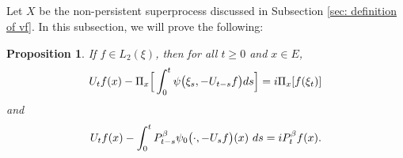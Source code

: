 \documentclass[12pt]{amsart}
\theoremstyle{plain}
\newtheorem{prop}[thm]{Proposition}
\theoremstyle{definition}
\numberwithin{equation}{section}
\begin{document}
\subsection{}
	Let $X$ be the non-persistent superprocess discussed in Subsection \ref{sec: definition of vf}. 
	In this subsection, we will prove the following:
	\begin{prop}
\label{prop: complex FKPP-equation}
    If $f\in L_2(\xi)$,  then for all $t\geq 0$ and $x\in E$,
\begin{equation}
\label{eq: complex FKPP-equation}
    U_tf(x) - \Pi_x \Big[\int_0^t \psi\big(\xi_s, - U_{t-s}f\big) ds \Big]
    \\= i \Pi_x [f(\xi_t)]
\end{equation}
and
\begin{equation}
\label{eq: complex FKPP-equation with FK-transform}
    U_tf(x) -  \int_0^t P_{t-s}^{\beta} \psi_0\big(\cdot,-U_sf\big) (x)~ds
    \\= iP_t^\beta f(x).
\end{equation}
\end{prop} 
\end{document}
